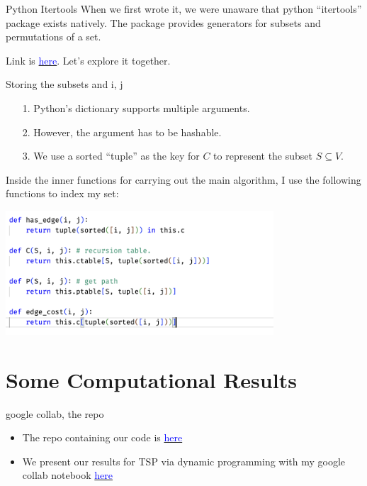 \documentclass[11pt]{beamer}
\begin{document}
    \begin{frame}{Python Itertools}
        When we first wrote it, we were unaware that python ``itertools'' package exists natively. The package provides generators for subsets and permutations of a set. 
        \vspace{2em}
        \par
        Link is \href{https://docs.python.org/3.10/library/itertools.html}{\textcolor{blue}{here}}. Let's explore it together. 
    \end{frame}
    \begin{frame}{Storing the subsets and i, j}
        \begin{itemize}
            \item [1.] Python's dictionary supports multiple arguments. 
            \item [2.] However, the argument has to be hashable. 
            \item [3.] We use a sorted ``tuple'' as the key for $C$ to represent the subset $S\subseteq V$. 
        \end{itemize}
        Inside the inner functions for carrying out the main algorithm, I use the following functions to index my set: 
        \begin{center}
            \includegraphics[width=10cm]{sorted_tuple_inner_fxns.png}
        \end{center}
    \end{frame}

\section{Some Computational Results}
    \begin{frame}{google collab, the repo}
        \begin{itemize}
            \item The repo containing our code is \href{https://github.com/hwh98/cosc-520-2022-TSP}{\textcolor{blue}{here}}
            \item We present our results for TSP via dynamic programming with my google collab notebook \href{https://colab.research.google.com/drive/1rDxQ5Vd2Hkc-5de9lT0GVDlrE3TL_uK3?usp=sharing}{\textcolor{blue}{here}}
        \end{itemize}
    \end{frame}
\end{document}
